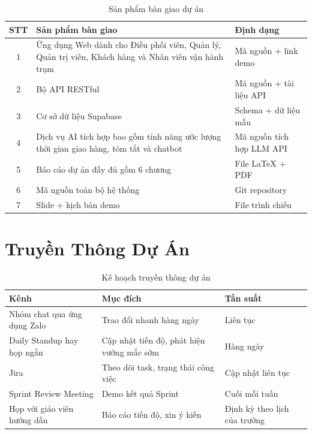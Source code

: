 \begin{table}[H]
  \centering
  \begin{tabularx}{\textwidth}{|c|X|l|}
    \hline
    \textbf{STT} & \textbf{Sản phẩm bàn giao} & \textbf{Định dạng} \\
    \hline
    1 & Ứng dụng Web dành cho Điều phối viên, Quản lý, Quản trị viên, Khách hàng và Nhân viên vận hành trạm & Mã nguồn + link demo \\ \hline
    2 & Bộ API RESTful & Mã nguồn + tài liệu API \\ \hline
    3 & Cơ sở dữ liệu Supabase & Schema + dữ liệu mẫu \\ \hline
    4 & Dịch vụ AI tích hợp bao gồm tính năng ước lượng thời gian giao hàng, tóm tắt và chatbot & Mã nguồn tích hợp LLM API \\ \hline
    5 & Báo cáo dự án đầy đủ gồm 6 chương & File LaTeX + PDF \\ \hline
    6 & Mã nguồn toàn bộ hệ thống & Git repository \\ \hline
    7 & Slide + kịch bản demo & File trình chiếu \\
    \hline
  \end{tabularx}
  \caption{Sản phẩm bàn giao dự án}
  \label{tab:deliverables}
\end{table}

\section{Truyền Thông Dự Án}

\begin{table}[H]
  \centering
  \begin{tabularx}{\textwidth}{|l|>{\raggedright\arraybackslash}X|l|}
    \hline
    \textbf{Kênh} & \textbf{Mục đích} & \textbf{Tần suất} \\
    \hline
    Nhóm chat qua ứng dụng Zalo & Trao đổi nhanh hàng ngày & Liên tục \\ \hline
    Daily Standup hay họp ngắn & Cập nhật tiến độ, phát hiện vướng mắc sớm & Hàng ngày \\ \hline
    Jira & Theo dõi task, trạng thái công việc & Cập nhật liên tục \\ \hline
    Sprint Review Meeting & Demo kết quả Sprint & Cuối mỗi tuần \\ \hline
    Họp với giáo viên hướng dẫn & Báo cáo tiến độ, xin ý kiến & Định kỳ theo lịch của trường \\
    \hline
  \end{tabularx}
  \caption{Kế hoạch truyền thông dự án}
  \label{tab:communication}
\end{table}

